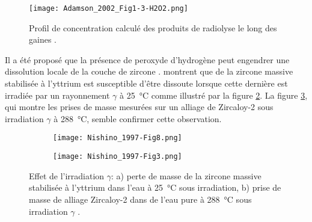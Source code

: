 \begin{refsection}
    \begin{figure}[H]
        \centering
        \texttt{[image: Adamson\_2002\_Fig1-3-H2O2.png]}
        \caption[Profil de concentration calculé des produits de radiolyse le long des gaines.]
        {Profil de concentration
        calculé des produits de radiolyse le long des gaines \citep{Adamson2002}.}
        \label{fig:radiloytic_species_profil}
    \end{figure}

    
    Il a été proposé que la présence de peroxyde d'hydrogène peut engendrer une dissolution locale de la couche de zircone
    \citep{IAEA1997}. \citet{Nishino1997} montrent que de la zircone massive stabilisée à l'yttrium est susceptible d'être
    dissoute lorsque cette dernière est irradiée par un rayonnement $\gamma$ à \SI{25}{\degreeCelsius} comme illustré
    par la figure \ref{subfig:Nishino_gamma_effect_YSZ}. La figure \ref{subfig:Nishino_gamma_effect_Zy2}, qui montre
    les prises de masse mesurées sur un alliage de Zircaloy-2 sous irradiation $\gamma$ à
    \SI{288}{\degreeCelsius}, semble confirmer cette observation.

    \begin{figure}[H]
        \centering
        \begin{subfigure}[b]{0.42\textwidth}
            \texttt{[image: Nishino\_1997-Fig8.png]}
            \caption{}
            \label{subfig:Nishino_gamma_effect_YSZ}
        \end{subfigure}
        \quad
        \begin{subfigure}[b]{0.48\textwidth}
            \texttt{[image: Nishino\_1997-Fig3.png]}
            \caption{}
            \label{subfig:Nishino_gamma_effect_Zy2}
        \end{subfigure}
        \caption[Effet de l'irradiation $\gamma$: 
        a) perte de masse de la zircone stabilisée à l'yttrium dans l'eau à \SI{25}{\degreeCelsius} sous irradiation,
        b) prise de masse de alliage Zircaloy-2  dans de l'eau pure à \SI{288}{\degreeCelsius} sous irradiation
    $\gamma$.]
        {Effet de l'irradiation $\gamma$: 
        a) perte de masse de la zircone massive stabilisée à l'yttrium dans l'eau à \SI{25}{\degreeCelsius} sous irradiation,
        b) prise de masse de alliage Zircaloy-2  dans de l'eau pure à \SI{288}{\degreeCelsius} sous irradiation $\gamma$
        \citep{Nishino1997}.}
        \label{fig:Nishino_Gamma_Effect}
    \end{figure}


\end{refsection}
